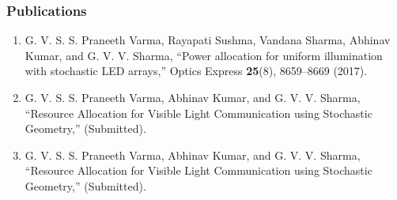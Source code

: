 \documentclass[slidestop,usepdftitle=false]{gvvslides}
\begin{document}
\begin{frame}
\frametitle{Publications}
\begin{enumerate}
\item
G. V. S. S. Praneeth Varma, Rayapati Sushma, Vandana Sharma, Abhinav Kumar, and G. V. V. Sharma, ``Power allocation for uniform illumination with stochastic LED arrays,'' Optics Express 
 \textbf{25}(8), 8659--8669 (2017).

\item
G. V. S. S. Praneeth Varma, Abhinav Kumar, and G. V. V. Sharma, ``Resource Allocation for Visible Light
Communication using Stochastic Geometry,'' (Submitted).

\item
G. V. S. S. Praneeth Varma, Abhinav Kumar, and G. V. V. Sharma, ``Resource Allocation for Visible Light
Communication using Stochastic Geometry,'' (Submitted).



\end{enumerate}
\end{frame}
\end{document}
